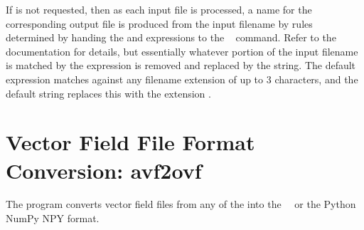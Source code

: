 If  is not requested, then as each input file is
processed, a name for the corresponding output file is produced from
the input filename by rules determined by handing the 
and  expressions to the \Tcl\  command.  Refer
to the \Tcl\  documentation for details, but essentially
whatever portion of the input filename is matched by the 
expression is removed and replaced by the  string.  The
default  expression matches against any filename
extension of up to 3 characters, and the default  string
replaces this with the extension .


\section{Vector Field File Format Conversion:
          avf2ovf}\label{sec:avf2ovf}%
%
The  program converts vector field files from any of the
\HTMLoutput{ (\OVF, \VIO)}
into the \OOMMF\ \OVF\ or the Python NumPy NPY format.

